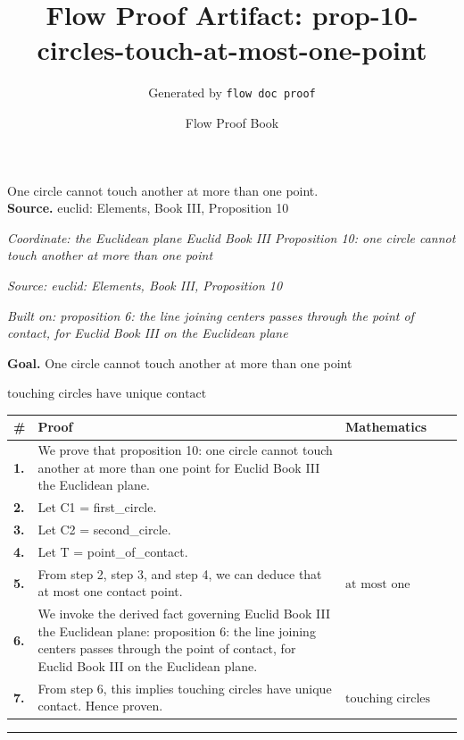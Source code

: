 \documentclass[11pt]{article}
\title{Flow Proof Artifact: prop-10-circles-touch-at-most-one-point}
\author{Generated by \texttt{flow doc proof}}
\date{Flow Proof Book}
\theoremstyle{definition}
\begin{document}
\maketitle
One circle cannot touch another at more than one point.\\[0.5em]
\textbf{Source.} euclid: Elements, Book III, Proposition 10\\[0.5em]
\bigskip
{}\par
\smallskip\noindent\textit{Coordinate: the Euclidean plane \cdot Euclid Book III \cdot Proposition 10: one circle cannot touch another at more than one point}\par
\smallskip\noindent\textit{Source: euclid: Elements, Book III, Proposition 10}\par
\smallskip\noindent\textit{Built on: proposition 6: the line joining centers passes through the point of contact, for Euclid Book III on the Euclidean plane}\par
\medskip
\noindent\textbf{Goal.} One circle cannot touch another at more than one point\par
\noindent$\displaystyle \text{touching circles have unique contact}$\par
\medskip
\noindent
\begin{tabular}{@{} >{\raggedright\arraybackslash}p{} >{\raggedright\arraybackslash}p{} >{\raggedleft\arraybackslash}p{} @{}}
\textbf{\#} & \textbf{Proof} & \textbf{Mathematics} \\
\midrule
\textbf{1.} & We prove that proposition 10: one circle cannot touch another at more than one point for Euclid Book III the Euclidean plane. & \\[0.45em]
\textbf{2.} & Let C1 = first\_circle. & \\[0.45em]
\textbf{3.} & Let C2 = second\_circle. & \\[0.45em]
\textbf{4.} & Let T = point\_of\_contact. & \\[0.45em]
\textbf{5.} & From step 2, step 3, and step 4, we can deduce that at most one contact point. & $\displaystyle \text{at most one contact point}$ \\[0.45em]
\textbf{6.} & We invoke the derived fact governing Euclid Book III the Euclidean plane: proposition 6: the line joining centers passes through the point of contact, for Euclid Book III on the Euclidean plane. & \\[0.45em]
\textbf{7.} & From step 6, this implies touching circles have unique contact. Hence proven. & $\displaystyle \text{touching circles have unique contact}$ \\[0.45em]
\bottomrule
\end{tabular}
\label{thm:Geometry-Euclid Book III-proposition_10_one_circle_cannot_touch_another_at_more_than_one_point}
\par\medskip\hrule
\end{document}
